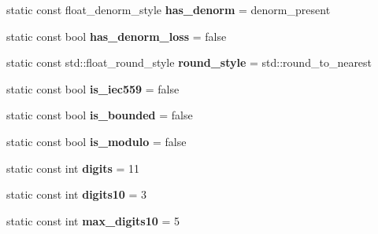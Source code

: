 \begin{DoxyCompactItemize}
static const float\+\_\+denorm\+\_\+style {\bfseries has\+\_\+denorm} = denorm\+\_\+present
\item 
\mbox{\label{structstd_1_1numeric__limits_3_01_eigen_1_1half_01_4_a8e5823cf31d17a7114ec82d86ab72e3b}} 
static const bool {\bfseries has\+\_\+denorm\+\_\+loss} = false
\item 
\mbox{\label{structstd_1_1numeric__limits_3_01_eigen_1_1half_01_4_a34e3af89fb70b7e14191f852e5a43d38}} 
static const std\+::float\+\_\+round\+\_\+style {\bfseries round\+\_\+style} = std\+::round\+\_\+to\+\_\+nearest
\item 
\mbox{\label{structstd_1_1numeric__limits_3_01_eigen_1_1half_01_4_ab4c82e6e7c3df5a1105556eeb9e9df58}} 
static const bool {\bfseries is\+\_\+iec559} = false
\item 
\mbox{\label{structstd_1_1numeric__limits_3_01_eigen_1_1half_01_4_aaa936846c20463800736835fba6711ec}} 
static const bool {\bfseries is\+\_\+bounded} = false
\item 
\mbox{\label{structstd_1_1numeric__limits_3_01_eigen_1_1half_01_4_ab5b57cf00cd2edc53eaba27cd5ea6f63}} 
static const bool {\bfseries is\+\_\+modulo} = false
\item 
\mbox{\label{structstd_1_1numeric__limits_3_01_eigen_1_1half_01_4_a91b8bad7187ffaf230ef371991797928}} 
static const int {\bfseries digits} = 11
\item 
\mbox{\label{structstd_1_1numeric__limits_3_01_eigen_1_1half_01_4_a7b371870b43b6b4c3a3e1cb07e3dbe60}} 
static const int {\bfseries digits10} = 3
\item 
\mbox{\label{structstd_1_1numeric__limits_3_01_eigen_1_1half_01_4_a6e32b1140c369a123cecd8b7e3c21e2c}} 
static const int {\bfseries max\+\_\+digits10} = 5
\item 

\end{DoxyCompactItemize}
